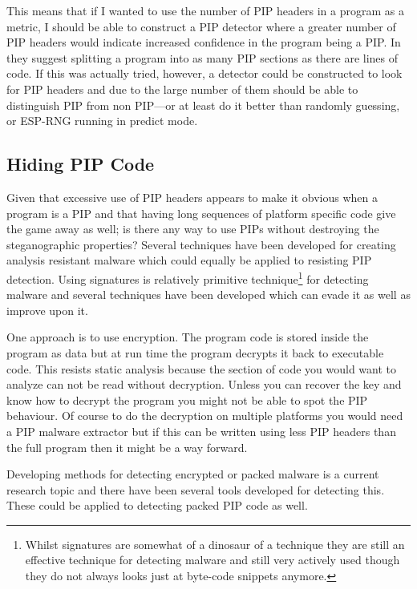 \documentclass[10pt]{book}
\begin{document}
This means that if I wanted to use the number of PIP headers in a
program as a metric, I should be able to construct a PIP detector where
a greater number of PIP headers would indicate increased confidence in
the program being a PIP. In \autocite{Cha:2010uh} they suggest splitting
a program into as many PIP sections as there are lines of code. If this
was actually tried, however, a detector could be constructed to look for
PIP headers and due to the large number of them should be able to
distinguish PIP from non PIP---or at least do it better than randomly
guessing, or ESP-RNG running in predict mode\autocite{Birkett:vw}.

\subsection{Hiding PIP Code}

Given that excessive use of PIP headers appears to make it obvious when
a program is a PIP and that having long sequences of platform specific
code give the game away as well; is there any way to use PIPs without
destroying the steganographic properties? Several techniques have been
developed for creating analysis resistant
malware\autocite{Bethencourt:2008ug} which could equally be applied to
resisting PIP detection. Using signatures is relatively primitive
technique\footnote{Whilst signatures are somewhat of a
  dinosaur\autocite{Lull:1910tz} of a technique they are still an
  effective technique for detecting malware and still very actively used
  though they do not always looks just at byte-code snippets
  anymore.\autocite{Acosta:wz}\autocite{Liang:2011va}} for detecting
malware\autocite{Zhang:2007jy} and several techniques have been
developed which can evade it as well as improve upon it.

One approach is to use encryption. The program code is stored inside the
program as data but at run time the program decrypts it back to
executable code\autocite{Royal:2006ug}. This resists static analysis
because the section of code you would want to analyze can not be read
without decryption. Unless you can recover the key and know how to
decrypt the program you might not be able to spot the PIP behaviour. Of
course to do the decryption on multiple platforms you would need a PIP
malware extractor but if this can be written using less PIP headers than
the full program then it might be a way forward.

Developing methods for detecting encrypted or packed malware is a
current research topic and there have been several tools developed for
detecting this\autocite{Chouchane:2006cf}\autocite{Zhang:2007jy}. These
could be applied to detecting packed PIP code as well.
\end{document}
